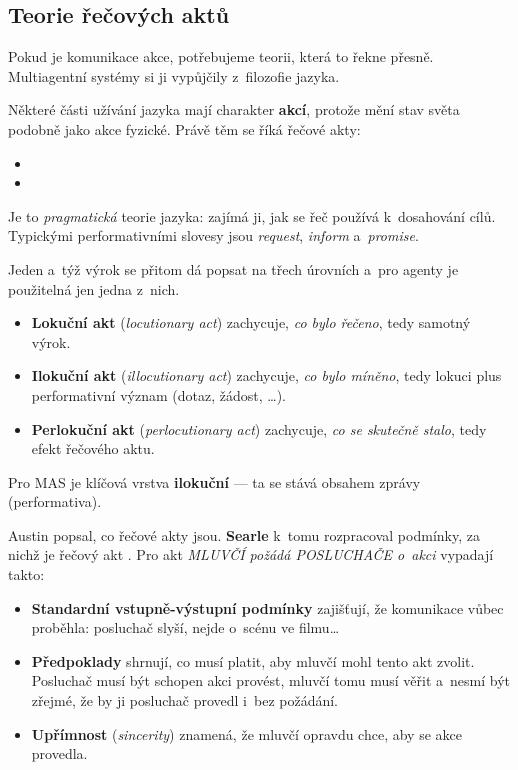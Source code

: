 \documentclass[11pt,a4paper]{article}
\theoremstyle{definition}
\begin{document}
\subsection{Teorie řečových aktů}

Pokud je komunikace akce, potřebujeme teorii, která to řekne přesně. Multiagentní systémy si ji
vypůjčily z~filozofie jazyka.

\begin{defbox}
Některé části užívání jazyka mají charakter \textbf{akcí}, protože mění stav světa podobně jako
akce fyzické. Právě těm se říká řečové akty:
\begin{itemize}
\item {}
\item {}
\end{itemize}
Je to \emph{pragmatická} teorie jazyka: zajímá ji, jak se řeč používá k~dosahování cílů.
Typickými performativními slovesy jsou \emph{request}, \emph{inform} a~\emph{promise}.
\end{defbox}

Jeden a~týž výrok se přitom dá popsat na třech úrovních a~pro agenty je použitelná jen jedna
z~nich.

\begin{defbox}
\begin{itemize}
\item \textbf{Lokuční akt} (\emph{locutionary act}) zachycuje, \emph{co bylo řečeno}, tedy
  samotný výrok. 
\item \textbf{Ilokuční akt} (\emph{illocutionary act}) zachycuje, \emph{co bylo míněno}, tedy
  lokuci plus performativní význam (dotaz, žádost, \dots). 
\item \textbf{Perlokuční akt} (\emph{perlocutionary act}) zachycuje, \emph{co se skutečně
  stalo}, tedy efekt řečového aktu. 
\end{itemize}
Pro MAS je klíčová vrstva \textbf{ilokuční} --- ta se stává obsahem zprávy (performativa).
\end{defbox}

Austin popsal, co řečové akty jsou. \textbf{Searle} k~tomu rozpracoval podmínky, za nichž je
řečový akt . Pro akt \emph{MLUVČÍ požádá POSLUCHAČE o~akci} vypadají takto:
\begin{itemize}
\item \textbf{Standardní vstupně-výstupní podmínky} zajišťují, že komunikace vůbec proběhla:
  posluchač slyší, nejde o~scénu ve filmu\dots
\item \textbf{Předpoklady} shrnují, co musí platit, aby mluvčí mohl tento akt zvolit. Posluchač
  musí být schopen akci provést, mluvčí tomu musí věřit a~nesmí být zřejmé, že by ji posluchač
  provedl i~bez požádání.
\item \textbf{Upřímnost} (\emph{sincerity}) znamená, že mluvčí opravdu chce, aby se akce
  provedla.
\end{itemize}
\end{document}
